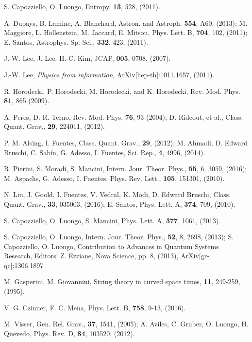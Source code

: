 \documentclass[nofootinbib,prd,superscriptaddress,showpacs,showkeys,]{revtex4}
\begin{document}
\begin{thebibliography}{99}
S. Capozziello, O. Luongo, Entropy, {\bf 13}, 528, (2011).

A. Dupays, B. Lamine, A. Blanchard, Astron. and Astroph. {\bf 554}, A60, (2013); M. Maggiore, L. Hollenstein, M. Jaccard, E. Mitsou, Phys. Lett. B, {\bf 704},  102, (2011); E. Santos, Astrophys. Sp. Sci., {\bf 332}, 423, (2011).

J.-W. Lee, J. Lee, H.-C. Kim, JCAP, {\bf 005}, 0708, (2007).

J.-W. Lee, \emph{Physics from information}, ArXiv[hep-th]:1011.1657, (2011).


R. Horodecki, P. Horodecki, M. Horodecki, and K. Horodecki, Rev. Mod. Phys. \textbf{81}, 865 (2009).

A. Peres, D. R. Terno, Rev. Mod. Phys. {\bf 76}, 93 (2004); D. Rideout, et al., Class. Quant. Grav., {\bf 29}, 224011, (2012).

P. M. Alsing, I. Fuentes, Class. Quant. Grav., {\bf 29}, (2012); M. Ahmadi, D. Edward Bruschi, C. Sabín, G. Adesso, I. Fuentes, Sci. Rep., {\bf 4}, 4996, (2014).

R. Pierini, S. Moradi, S. Mancini, Intern. Jour. Theor. Phys., {\bf 55}, 6, 3059, (2016); M. Aspachs, G. Adesso, I. Fuentes, Phys. Rev. Lett., {\bf 105}, 151301, (2010).

N. Liu, J. Goold, I. Fuentes, V. Vedral, K. Modi, D. Edward Bruschi, Class. Quant. Grav., {\bf 33}, 035003, (2016); E. Santos, Phys. Lett. A, {\bf 374}, 709, (2010).

S. Capozziello, O. Luongo, S. Mancini, Phys. Lett. A, {\bf 377}, 1061, (2013).

S. Capozziello, O. Luongo, Intern. Jour. Theor. Phys., {\bf 52}, 8, 2698, (2013); S. Capozziello, O. Luongo, Contribution to Advances in Quantum Systems Research, Editors: Z. Ezziane, Nova Science, pp. 8, (2013), ArXiv[gr-qc]:1306.1897

M. Gasperini, M. Giovannini, String theory in curved space times, {\bf 11}, 249-259, (1995).

V. G. Czinner, F. C. Mena, Phys. Lett. B, {\bf 758}, 9-13, (2016).



M. Visser, Gen. Rel. Grav., {\bf 37}, 1541, (2005); A. Aviles, C. Gruber, O. Luongo, H. Quevedo, Phys. Rev. D, {\bf 84}, 103520, (2012).


\end{thebibliography}
\end{document}
